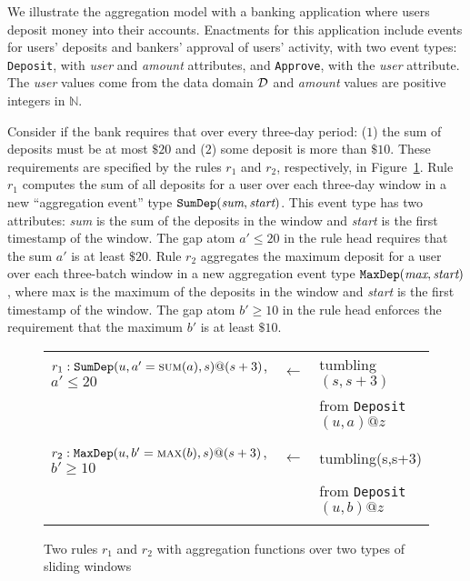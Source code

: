 \begin{examp}\label{examp:banking-aggregation-rules}
We illustrate the aggregation model with
a banking application
where users deposit money into their accounts.
Enactments for this application include
events for users' deposits
and bankers' approval of users' activity,
with two event types:
{\tt Deposit},
with {\em user} and {\em amount} attributes,
and {\tt Approve}, with the {\em user} attribute.
The {\em user} values come from the data domain $\mathcal{D}$
and {\em amount} values are positive integers in $\mathbb{N}$.

Consider if the bank
requires that over every three-day period:
($1$) the sum of deposits must be at most $\$20$ and
($2$) some deposit is more than $\$10$.
These requirements are
specified by the rules $r_1$ and $r_2$, respectively,
in Figure~\ref{fig:aggregation-rules-2}.
Rule $r_1$ 
computes the sum of all deposits for a user
over each three-day window
in a new ``aggregation event'' type
$\mbox{\tt SumDep}(\mbox{\em{sum}},\mbox{\em start})$.
This event type has two attributes:
{\em sum} is the sum of the deposits in the window
and {\em start} is the first timestamp of the window.
The gap atom $a'\leq 20$ in the rule head
requires that the sum $a'$ is at least $\$20$.
Rule $r_2$ aggregates
the maximum deposit for a user
over each three-batch window
in a new aggregation event type
$\mbox{\tt MaxDep}(\mbox{\em max},\mbox{\em start})$,
where {\sc max} is the maximum of the deposits in the window
and {\em start} is the first timestamp of the window.
The gap atom $b'\geq 10$ in the rule head
enforces the requirement that the maximum $b'$ is at least $\$10$.
\end{examp}

\begin{figure}[ht]
    \centering
\begin{tabular}{lcl}
$r_1: \mbox{\tt SumDep}(u,a'=\mbox{\sc sum}(a),s)@(s+3)$, $a'\leq 20$ & $\leftarrow$ & {\sc tumbling}$(s,s+3)$                \\
                                                                    &                & {\sc from} \mbox{\tt Deposit}$(u,a)@z$   \\
                                                                    &                &                                          \\
$r_2: \mbox{\tt MaxDep}(u,b'=\mbox{\sc max}(b),s)@(s+3)$, $b'\geq 10$ & $\leftarrow$ & {\sc tumbling}(s,s+3)                  \\
                                                                    &                & {\sc from} \mbox{\tt Deposit}$(u,b)@z$   \\
                                                                    &                &                                          \\
\end{tabular}
\caption{Two rules $r_1$ and $r_2$ with aggregation functions over two types of sliding windows}
\label{fig:aggregation-rules-2}
\end{figure}

